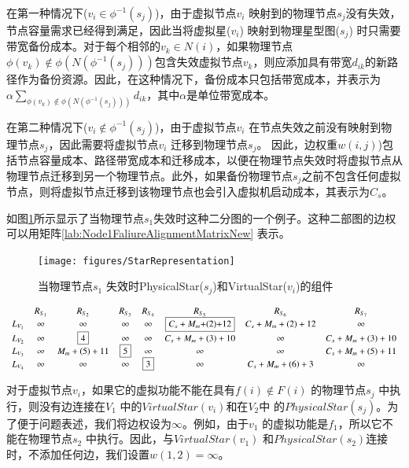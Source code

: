 在第一种情况下(${v_i} \in {\phi ^{ - 1}}({s_j})$)，由于虚拟节点$v_i$ 映射到的物理节点$s_j$没有失效，节点容量需求已经得到满足，因此当将虚拟星($v_i$) 映射到物理星型图($s_j$) 时只需要带宽备份成本。对于每个相邻的$v_k \in N(i)$，如果物理节点${\phi ({v_k}) \notin \phi (N({\phi ^{ - 1}}({s_j})))}$包含失效虚拟节点$v_k$，则应添加具有带宽$d_{ik}$的新路径作为备份资源。因此，在这种情况下，备份成本只包括带宽成本，并表示为$ { \alpha \sum\limits_{\phi ({v_k}) \notin \phi (N({\phi ^{ - 1}}({s_j})))} {{d_{ik}}} }$，其中$\alpha$是单位带宽成本。

在第二种情况下(${v_i} \notin {\phi ^{ - 1}}({s_j})$)，由于虚拟节点$v_i$ 在节点失效之前没有映射到物理节点$s_j$，因此需要将虚拟节点$v_i$ 迁移到物理节点$s_j$。 因此，边权重$w(i,j)$)包括节点容量成本、路径带宽成本和迁移成本，以便在物理节点失效时将虚拟节点从物理节点迁移到另一个物理节点。此外，如果备份物理节点$s_j$之前不包含任何虚拟节点，则将虚拟节点迁移到该物理节点也会引入虚拟机启动成本，其表示为$C_s$。

如图\ref{fig:StarRepresentation}所示显示了当物理节点$s_1$失效时这种二分图的一个例子。这种二部图的边权可以用矩阵\ref{lab:Node1FaliureAlignmentMatrixNew} 表示。
\begin{figure}
\centering
\texttt{[image: figures/StarRepresentation]}\\
  \caption{当物理节点$s_1$ 失效时PhysicalStar($s_j$)和VirtualStar($v_i$)的组件}\label{fig:StarRepresentation}
\end{figure}

\begin{equation*}
\small{
 {\begin{array}{*{20}{c}}
&R_{S_{1}}&R_{S_{2}}&R_{S_3}&R_{S_4}&R_{S_5}&R_{S_6}&R_{S_{7}}\\
{L_{V_1}}&\infty&\infty&\infty&\infty&\fbox{$C_{s}+M_{m}$+(2)+12}&C_{s}+M_{m}+(2)+12&\infty\\
L_{V_2}&\infty&\fbox{4}&\infty&\infty&C_{s}+M_{m}+(3)+10&\infty&C_{s}+M_{m}+(3)+10\\
L_{V_3}&\infty&M_{m}+(5)+11&\fbox{5}&\infty&\infty&\infty&C_{s}+M_{m}+(5)+11\\
L_{V_4}&\infty&\infty&\infty&\fbox{3}&\infty&C_{s}+M_{m}+(6)+3&\infty\\
\end{array}}
}
\label{lab:Node1FaliureAlignmentMatrixNew}
\end{equation*}


对于虚拟节点$v_i$，如果它的虚拟功能不能在具有$f(i) \notin F(i)$ 的物理节点$s_j$ 中执行，则没有边连接在$V_1$ 中的$VirtualStar(v_i)$和在$V_2$中 的$PhysicalStar(s_j)$。为了便于问题表述，我们将边权设为$\infty $。例如，由于$v_1$ 的虚拟功能是$f_1$，所以它不能在物理节点$s_2$ 中执行。因此，与$VirtualStar(v_1)$ 和$PhysicalStar(s_2)$连接时，不添加任何边，我们设置$w(1,2)=\infty$。

